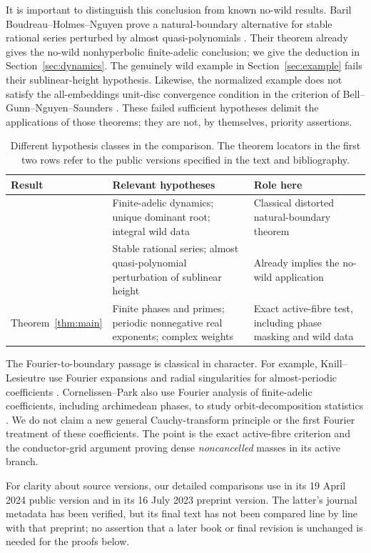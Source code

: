 It is important to distinguish this conclusion from known no-wild
results. Baril Boudreau--Holmes--Nguyen prove a natural-boundary
alternative for stable rational series perturbed by almost
quasi-polynomials \citep{bhn2025}. Their theorem already gives the
no-wild nonhyperbolic finite-adelic conclusion; we give the deduction
in Section~\ref{sec:dynamics}. The genuinely wild example in
Section~\ref{sec:example} fails their sublinear-height hypothesis.
Likewise, the normalized example does not satisfy the all-embeddings
unit-disc convergence condition in the criterion of
Bell--Gunn--Nguyen--Saunders \citep{bgns2023}.
These failed sufficient hypotheses delimit the applications of those
theorems; they are not, by themselves, priority assertions.

\begin{table}[t]
\centering
\small
\begin{tabular}{@{}>{\raggedright\arraybackslash}p{}
>{\raggedright\arraybackslash}p{}
>{\raggedright\arraybackslash}p{}@{}}
\toprule
Result & Relevant hypotheses & Role here\\
\midrule
\citep[Theorem 11.3.8]{bch2024}
& Finite-adelic dynamics; unique dominant root; integral wild data
& Classical distorted natural-boundary theorem\\[3pt]
\citep[Theorem 2.14]{bhn2025}
& Stable rational series; almost quasi-polynomial perturbation of
sublinear height
& Already implies the no-wild application\\[3pt]
Theorem~\ref{thm:main}
& Finite phases and primes; periodic nonnegative real exponents;
complex weights
& Exact active-fibre test, including phase masking and wild data\\
\bottomrule
\end{tabular}
\caption{Different hypothesis classes in the comparison. The theorem
locators in the first two rows refer to the public versions specified
in the text and bibliography.}
\label{tab:scope}
\end{table}

The Fourier-to-boundary passage is classical in character.
For example, Knill--Lesieutre use Fourier expansions and radial
singularities for almost-periodic coefficients
\citep[Proposition 2.2 in the revised manuscript]{kl2012}.
Cornelissen--Park also use Fourier analysis of finite-adelic
coefficients, including archimedean phases, to study orbit-decomposition
statistics \citep{cp2026}. We do not claim a new general Cauchy-transform
principle or the first Fourier treatment of these coefficients.
The point is the exact active-fibre criterion and the conductor-grid
argument proving dense \emph{noncancelled} masses in its active branch.

For clarity about source versions, our detailed comparisons use
\citep{bch2024} in its 19 April 2024 public version and
\citep{bhn2025} in its 16 July 2023 preprint version.
The latter's journal metadata has been verified, but its final text
has not been compared line by line with that preprint; no assertion
that a later book or final revision is unchanged is needed for the
proofs below.
